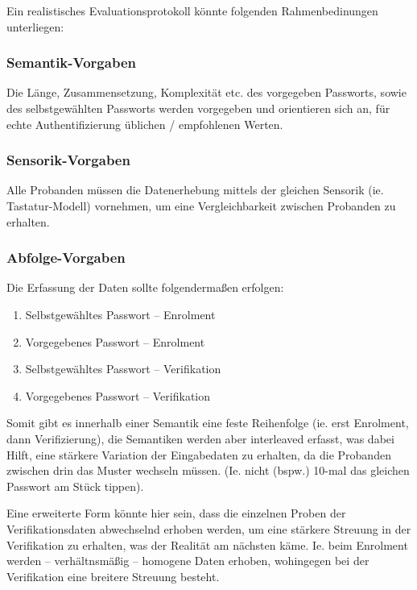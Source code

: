 \documentclass{article}
\begin{document}
Ein realistisches Evaluationsprotokoll könnte folgenden Rahmenbedinungen unterliegen:

\subsubsection*{Semantik-Vorgaben}

Die Länge, Zusammensetzung, Komplexität etc. des vorgegeben Passworts, sowie des selbstgewählten Passworts
werden vorgegeben und orientieren sich an, für echte Authentifizierung üblichen / empfohlenen Werten.

\subsubsection*{Sensorik-Vorgaben}

Alle Probanden müssen die Datenerhebung mittels der gleichen Sensorik (ie. Tastatur-Modell) vornehmen, um
eine Vergleichbarkeit zwischen Probanden zu erhalten.

\subsubsection*{Abfolge-Vorgaben}

Die Erfassung der Daten sollte folgendermaßen erfolgen:

\begin{enumerate}
	\item Selbstgewähltes Passwort – Enrolment
	\item Vorgegebenes Passwort – Enrolment
	\item Selbstgewähltes Passwort – Verifikation
	\item Vorgegebenes Passwort – Verifikation
\end{enumerate}

Somit gibt es innerhalb einer Semantik eine feste Reihenfolge (ie. erst Enrolment, dann Verifizierung),
die Semantiken werden aber interleaved erfasst, was dabei Hilft, eine stärkere Variation der Eingabedaten
zu erhalten, da die Probanden zwischen drin das Muster wechseln müssen. (Ie. nicht (bspw.) 10-mal das 
gleichen Passwort am Stück tippen).

Eine erweiterte Form könnte hier sein, dass die einzelnen Proben der Verifikationsdaten abwechselnd 
erhoben werden, um eine stärkere Streuung in der Verifikation zu erhalten, was der Realität am nächsten 
käme. Ie. beim Enrolment werden – verhältnsmäßig – homogene Daten erhoben, wohingegen bei der Verifikation
eine breitere Streuung besteht.
\end{document}
